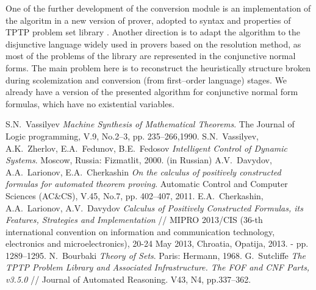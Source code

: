 \documentclass[a4paper,12pt]{article}
\begin{document}
One of the further development of the conversion module is an implementation of the algoritm in a new version of prover, adopted to syntax and properties of TPTP problem set library \cite{tptp}.  Another direction is to adapt the algorithm to the disjunctive language widely used in provers based on the resolution method, as most of the problems of the library are represented in the conjunctive normal forms.  The main problem here is to reconstruct the heuristically structure broken during scolemization and conversion (from first--order language) stages.  We already have a version of the presented algorithm for conjunctive normal form formulas, which have no existential variables.

\begin{thebibliography}{9}
 S.N.~Vassilyev \emph{Machine Synthesis of Mathematical Theorems}. The Journal of Logic programming, V.9, No.2--3, pp. 235--266,1990.
 S.N.~Vassilyev, A.K.~Zherlov, E.A.~Fedunov, B.E.~Fedosov \emph{Intelligent Control of Dynamic Systems}. Moscow, Russia: Fizmatlit, 2000. (in Russian)
 A.V.~Davydov, A.A.~Larionov, E.A.~Cherkashin \emph{On the calculus of positively constructed formulas for automated theorem proving}. Automatic Control and Computer Sciences (AC\&CS), V.45, No.7, pp. 402--407, 2011.
 E.A.~Cherkashin, A.A.~Larionov, A.V.~Davydov \emph{Calculus of Positively Constructed Formulas, its Features, Strategies and Implementation} // MIPRO 2013/CIS (36-th international convention on information and communication technology, electronics and microelectronics), 20-24 May 2013, Chroatia, Opatija, 2013. - pp. 1289--1295.
 N.~Bourbaki \emph{Theory of Sets}. Paris: Hermann, 1968.
 G.~Sutcliffe \emph{The TPTP Problem Library and Associated Infrastructure. The FOF and CNF Parts, v3.5.0} // Journal of Automated Reasoning. V43, N4, pp.337--362.
\end{thebibliography}
\end{document}
